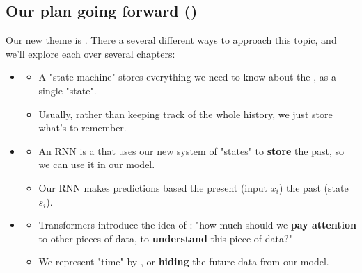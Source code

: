         
    \subsection{Our plan going forward ()}
        
        Our new theme is . There a several different ways to approach this topic, and we'll explore each over several chapters:
        
        \begin{itemize}
            \item {}
                \begin{itemize}
                    \item A "state machine" stores everything we need to know about the , as a single "state".
                    
                    \item Usually, rather than keeping track of the whole history, we just store what's  to remember.
                \end{itemize}

            \item {}

                \begin{itemize}
                    \item An RNN is a  that uses our new system of "states" to \textbf{store} the past, so we can use it in our model.
                    
                    \item Our RNN makes predictions based the present (input $x_i$)  the past (state $s_i$).
                \end{itemize}

            \item {}
                \begin{itemize}
                    \item Transformers introduce the idea of : "how much should we \textbf{pay attention} to other pieces of data, to \textbf{understand} this piece of data?"
                    
                    \item We represent "time" by , or \textbf{hiding} the future data from our model.
                \end{itemize}
            

\end{itemize}

